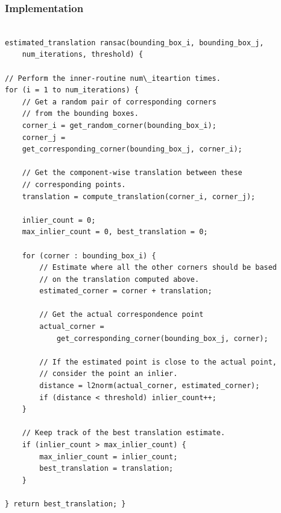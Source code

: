 \documentclass{article}
\begin{document}
\subsubsection{Implementation}
\begin{minipage}{\textwidth}
\begin{lstlisting}

estimated_translation ransac(bounding_box_i, bounding_box_j,
	num_iterations, threshold) {

// Perform the inner-routine num\_iteartion times.
for (i = 1 to num_iterations) {
	// Get a random pair of corresponding corners
	// from the bounding boxes.
	corner_i = get_random_corner(bounding_box_i);
	corner_j =
	get_corresponding_corner(bounding_box_j, corner_i);
	
	// Get the component-wise translation between these
	// corresponding points.
	translation = compute_translation(corner_i, corner_j);
	
	inlier_count = 0;
	max_inlier_count = 0, best_translation = 0;
	
	for (corner : bounding_box_i) {
		// Estimate where all the other corners should be based
		// on the translation computed above.
		estimated_corner = corner + translation;
		
		// Get the actual correspondence point
		actual_corner =
			get_corresponding_corner(bounding_box_j, corner);
		
		// If the estimated point is close to the actual point,
		// consider the point an inlier.
		distance = l2norm(actual_corner, estimated_corner);
		if (distance < threshold) inlier_count++;
	}
	
	// Keep track of the best translation estimate.
	if (inlier_count > max_inlier_count) {
		max_inlier_count = inlier_count;
		best_translation = translation;
	}
		
} return best_translation; }

\end{lstlisting}
\end{minipage}
\end{document}

